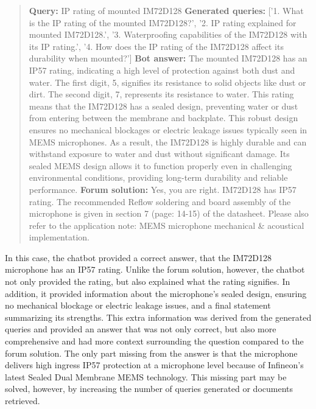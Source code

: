 \documentclass{article}
\begin{document}
\begin{quote}
\textbf{Query:} IP rating of mounted IM72D128 \newline
\textbf{Generated queries:} ['1. What is the IP rating of the mounted IM72D128?', '2. IP rating explained for mounted IM72D128.', '3. Waterproofing capabilities of the IM72D128 with its IP rating.', '4. How does the IP rating of the IM72D128 affect its durability when mounted?'] \newline
\textbf{Bot answer:} The mounted IM72D128 has an IP57 rating, indicating a high level of protection against both dust and water. The first digit, 5, signifies its resistance to solid objects like dust or dirt. The second digit, 7, represents its resistance to water. This rating means that the IM72D128 has a sealed design, preventing water or dust from entering between the membrane and backplate. This robust design ensures no mechanical blockages or electric leakage issues typically seen in MEMS microphones. As a result, the IM72D128 is highly durable and can withstand exposure to water and dust without significant damage. Its sealed MEMS design allows it to function properly even in challenging environmental conditions, providing long-term durability and reliable performance. \newline
\textbf{Forum solution: } Yes, you are right. IM72D128 has IP57 rating. The recommended Reflow soldering and board assembly of the microphone is given in section 7 (page: 14-15) of the datasheet. Please also refer to the application note: MEMS microphone mechanical \& acoustical implementation. \end{quote}

In this case, the chatbot provided a correct answer, that the IM72D128 microphone has an IP57 rating. Unlike the forum solution, however, the chatbot not only provided the rating, but also explained what the rating signifies. In addition, it provided information about the microphone's sealed design, ensuring no mechanical blockage or electric leakage issues, and a final statement summarizing its strengths. This extra information was derived from the generated queries and provided an answer that was not only correct, but also more comprehensive and had more context surrounding the question compared to the forum solution. The only part missing from the answer is that the microphone delivers high ingress IP57 protection at a microphone level because of Infineon's latest Sealed Dual Membrane MEMS technology. This missing part may be solved, however, by increasing the number of queries generated or documents retrieved.
\end{document}
